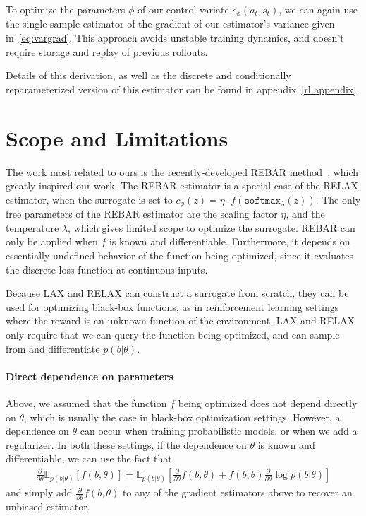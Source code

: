 \documentclass{article}
\newcommand{\E}{\mathbb{E}}
\newcommand{\PT}{\frac{\partial}{\partial \theta}}
\newcommand{\LAX}{{\textnormal{LAX}}}
\newcommand{\RELAX}{{\textnormal{RELAX}}}
\begin{document}
To optimize the parameters $\phi$ of our control variate $c_\phi(a_t, s_t)$, we can again use the single-sample estimator of the gradient of our estimator's variance given in~\eqref{eq:vargrad}.
This approach avoids unstable training dynamics, and doesn't require storage and replay of previous rollouts.

Details of this derivation, as well as the discrete and conditionally reparameterized version of this estimator can be found in appendix~\ref{rl appendix}.


\section{Scope and Limitations}
\label{limitations}
The work most related to ours is the recently-developed REBAR method~\citep{tucker2017rebar}, which greatly inspired our work.
The REBAR estimator is a special case of the \RELAX{} estimator, when the surrogate is set to ${c_\phi(z) = \eta \cdot f(\texttt{softmax}_\lambda(z))}$.
The only free parameters of the REBAR estimator are the scaling factor $\eta$, and the temperature $\lambda$, which gives limited scope to optimize the surrogate.
REBAR can only be applied when $f$ is known and differentiable.
Furthermore, it depends on essentially undefined behavior of the function being optimized, since it evaluates the discrete loss function at continuous inputs.

Because \LAX{} and \RELAX{} can construct a surrogate from scratch, they can be used for optimizing black-box functions, as in reinforcement learning settings where the reward is an unknown function of the environment.
\LAX{} and \RELAX{} only require that we can query the function being optimized, and can sample from and differentiate $p(b|\theta)$.


\paragraph{Direct dependence on parameters}
Above, we assumed that the function $f$ being optimized does not depend directly on $\theta$, which is usually the case in black-box optimization settings.
However, a dependence on $\theta$ can occur when training probabilistic models, or when we add a regularizer. %
In both these settings, if the dependence on $\theta$ is known and differentiable, we can use the fact that
%
\begin{align}
\PT \E_{p(b|\theta)}[f(b, \theta)] = \E_{p(b|\theta)}\left[\PT f(b, \theta) + f(b, \theta)\PT \log p(b|\theta) \right]
\end{align}
%
and simply add $\PT f(b, \theta)$ to any of the gradient estimators above to recover an unbiased estimator.
\end{document}
